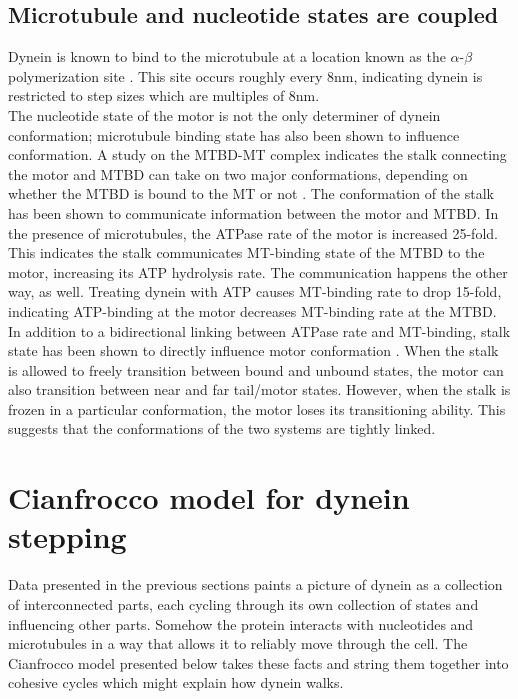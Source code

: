 \documentclass[
11pt, %
english, %
singlespacing, %
headsepline, %
chapterinoneline, %
]{MastersDoctoralThesis} %
\begin{document}
\subsection{Microtubule and nucleotide states are coupled}
Dynein is known to bind to the microtubule at a location known as the $\alpha$-$\beta$ polymerization site \cite{redwineMTBDcomplex}. This site occurs roughly every 8nm, indicating dynein is restricted to step sizes which are multiples of 8nm.\\

The nucleotide state of the motor is not the only determiner of dynein conformation; microtubule binding state has also been shown to influence conformation. A study on the MTBD-MT complex indicates the stalk connecting the motor and MTBD can take on two major conformations, depending on whether the MTBD is bound to the MT or not \cite{mt-atp-coupling}. The conformation of the stalk has been shown to communicate information between the motor and MTBD. In the presence of microtubules, the ATPase rate of the motor is increased 25-fold. This indicates the stalk communicates MT-binding state of the MTBD to the motor, increasing its ATP hydrolysis rate. The communication happens the other way, as well. Treating dynein with ATP causes MT-binding rate to drop 15-fold, indicating ATP-binding at the motor decreases MT-binding rate at the MTBD.\\

In addition to a bidirectional linking between ATPase rate and MT-binding, stalk state has been shown to directly influence motor conformation \cite{mt-atp-coupling}. When the stalk is allowed to freely transition between bound and unbound states, the motor can also transition between near and far tail/motor states. However, when the stalk is frozen in a particular conformation, the motor loses its transitioning ability. This suggests that the conformations of the two systems are tightly linked.\\

\section{Cianfrocco model for dynein stepping}
\label{sec:cianfrocco-model}
Data presented in the previous sections paints a picture of dynein as a collection of interconnected parts, each cycling through its own collection of states and influencing other parts. Somehow the protein interacts with nucleotides and microtubules in a way that allows it to reliably move through the cell. The Cianfrocco model presented below takes these facts and string them together into cohesive cycles which might explain how dynein walks.\\
\end{document}
